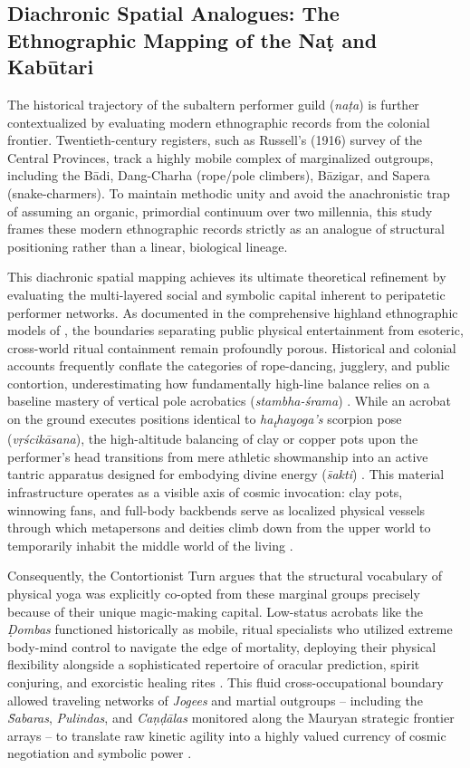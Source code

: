 \documentclass[11pt,twoside,letterpaper]{article}
\begin{document}
\subsection{Diachronic Spatial Analogues: The Ethnographic Mapping of the Naṭ and Kabūtari}
The historical trajectory of the subaltern performer guild (\textit{naṭa}) is further contextualized by evaluating modern ethnographic records from the colonial frontier. Twentieth-century registers, such as Russell’s (1916) survey of the Central Provinces, track a highly mobile complex of marginalized outgroups, including the Bādi, Dang-Charha (rope/pole climbers), Bāzigar, and Sapera (snake-charmers). To maintain methodic unity and avoid the anachronistic trap of assuming an organic, primordial continuum over two millennia, this study frames these modern ethnographic records strictly as an analogue of structural positioning rather than a linear, biological lineage.

This diachronic spatial mapping achieves its ultimate theoretical refinement by evaluating the multi-layered social and symbolic capital inherent to peripatetic performer networks. As documented in the comprehensive highland ethnographic models of \citet{Berger2023}, the boundaries separating public physical entertainment from esoteric, cross-world ritual containment remain profoundly porous. Historical and colonial accounts frequently conflate the categories of rope-dancing, jugglery, and public contortion, underestimating how fundamentally high-line balance relies on a baseline mastery of vertical pole acrobatics (\textit{stambha-śrama}) \citep{Berger2023}. While an acrobat on the ground executes positions identical to \textit{ha\textsubscript{t}hayoga's} scorpion pose (\textit{vṛścikāsana}), the high-altitude balancing of clay or copper pots upon the performer’s head transitions from mere athletic showmanship into an active tantric apparatus designed for embodying divine energy (\textit{s̄akti}) \citep{Berger2023}. This material infrastructure operates as a visible axis of cosmic invocation: clay pots, winnowing fans, and full-body backbends serve as localized physical vessels through which metapersons and deities climb down from the upper world to temporarily inhabit the middle world of the living \citep[397]{Berger2023}. 

Consequently, the Contortionist Turn argues that the structural vocabulary of physical yoga was explicitly co-opted from these marginal groups precisely because of their unique magic-making capital. Low-status acrobats like the \textit{Ḍombas} functioned historically as mobile, ritual specialists who utilized extreme body-mind control to navigate the edge of mortality, deploying their physical flexibility alongside a sophisticated repertoire of oracular prediction, spirit conjuring, and exorcistic healing rites \citep{Berger2023, Olivelle2011}. This fluid cross-occupational boundary allowed traveling networks of \textit{Jogees} and martial outgroups -- including the \textit{S̄abaras}, \textit{Pulindas}, and \textit{Caṇḍālas} monitored along the Mauryan strategic frontier arrays -- to translate raw kinetic agility into a highly valued currency of cosmic negotiation and symbolic power \citep{Kangle1969}. 
\end{document}
